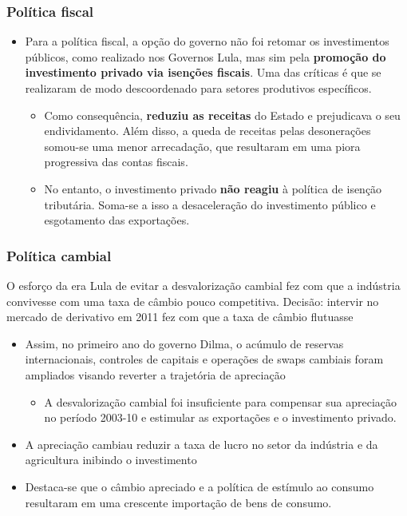 \documentclass[11pt]{article}
\begin{document}
\subsubsection*{Política fiscal}
\label{sec:org17cbac7}
\begin{itemize}
\item Para a política fiscal, a opção do governo não foi retomar os investimentos públicos, como realizado nos Governos Lula, mas sim pela \textbf{promoção do investimento privado via isenções fiscais}. Uma das críticas é que se realizaram de modo descoordenado para setores produtivos específicos.
\begin{itemize}
\item Como consequência, \textbf{reduziu as receitas} do Estado e prejudicava o seu endividamento. Além disso, a queda de receitas pelas desonerações somou-se uma menor arrecadação, que resultaram em uma piora progressiva das contas fiscais.
\item No entanto, o investimento privado \textbf{não reagiu} à política de isenção tributária. Soma-se a isso a desaceleração do investimento público e esgotamento das exportações.
\end{itemize}
\end{itemize}
\subsubsection*{Política cambial}
\label{sec:org30c2226}
O esforço da era Lula de evitar a desvalorização cambial fez com que a indústria convivesse com uma taxa de câmbio pouco competitiva. Decisão: intervir no mercado de derivativo em 2011 fez com que a taxa de câmbio flutuasse
\begin{itemize}
\item Assim, no primeiro ano do governo Dilma, o acúmulo de reservas internacionais, controles de capitais e operações de swaps cambiais foram ampliados visando reverter a trajetória de apreciação
\begin{itemize}
\item A desvalorização cambial foi insuficiente para compensar sua apreciação no período 2003-10 e estimular as exportações e o investimento privado.
\end{itemize}
\item A apreciação cambiau reduzir a taxa de lucro no setor da indústria e da agricultura inibindo o investimento
\item Destaca-se que o câmbio apreciado e a política de estímulo ao consumo resultaram em uma crescente importação de bens de consumo.
\end{itemize}
\end{document}

